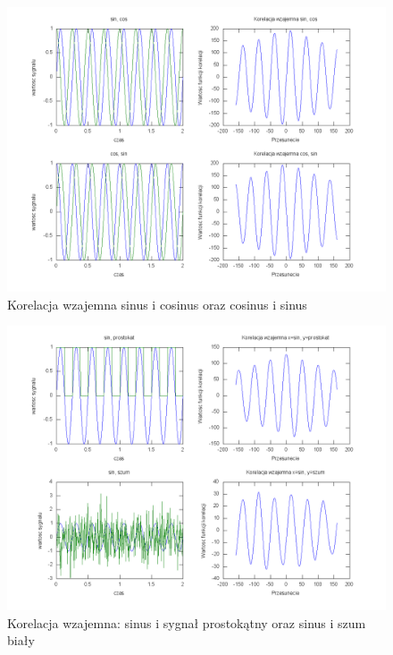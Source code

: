 \documentclass[wide,a4paper,titlepage,12pt]{mwart}
\begin{document}
      \begin{landscape}
        \begin{figure}[htbp]
          \begin{center}
            \includegraphics[scale=.5]{out/Figure4.png}
            \caption{\label{wykres4} Korelacja wzajemna sinus i cosinus oraz cosinus i sinus}
          \end{center}
        \end{figure}
      \end{landscape}

      \begin{landscape}
        \begin{figure}[htbp]
          \begin{center}
            \includegraphics[scale=.5]{out/Figure5.png}
            \caption{\label{wykres5} Korelacja wzajemna: sinus i sygnał prostokątny oraz sinus i szum biały}
          \end{center}
        \end{figure}
      \end{landscape}
  
\end{document}
